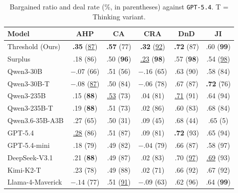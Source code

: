 \documentclass[11pt]{article}
\newcommand{\model}[1]{\texttt{#1}}
\newcommand{\lightrule}{\arrayrulecolor{black!20}\midrule\arrayrulecolor{black}}
\begin{document}
\begin{table}[ht]
\centering
\scriptsize
\setlength{\tabcolsep}{3pt}
\renewcommand{\arraystretch}{1.15}
\begin{tabular}{l c c c c c}
\toprule
\rowcolor{tableheader}
\textbf{Model} & \textbf{AHP} & \textbf{CA} & \textbf{CRA} & \textbf{DnD} & \textbf{JI} \\
\midrule
\rowcolor{tablerow}
Threshold (Ours) & \textbf{.35} (\underline{87}) & \textbf{.57} (77) & \textbf{.32} (\underline{92}) & \textbf{.72} (87) & .60 (\textbf{99}) \\
Surplus   & .18 (86)          & .50 (\textbf{96})  & \underline{.23} (\textbf{98})  & .57 (\textbf{98})  & .54 (\underline{98}) \\
\lightrule
\rowcolor{tablerow}
Qwen3-30B        & $-.07$ (66)          & .51 (56)           & $-.16$ (65)          & .63 (90)           & .58 (84)          \\
Qwen3-30B-T      & $-.08$ (\underline{87}) & .50 (84)        & $-.06$ (78)          & .67 (87)           & \textbf{.72} (76) \\
\rowcolor{tablerow}
Qwen3-235B       & .15 (\textbf{88})    & \underline{.53} (73) & .04 (81)          & \underline{.71} (91) & .64 (94)        \\
Qwen3-235B-T     & .19 (\textbf{88})    & .51 (73)           & .02 (86)             & .60 (83)           & .68 (84) \\
\rowcolor{tablerow}
Qwen3.6-35B-A3B  & .27 (65)    & .50 (31)           & .09 (45)             & .68 (44)           & .65 (5)           \\
GPT-5.4          & \underline{.28} (86)    & .51 (87)           & .09 (81)             & \textbf{.72} (93)  & .65 (94)          \\
GPT-5.4-mini     & .18 (79)             & .49 (82)           & $-.04$ (79)          & .66 (87)           & .58 (97)          \\
\rowcolor{tablerow}
DeepSeek-V3.1    & .21 (\textbf{88})    & .49 (87)           & .02 (83)          & .70 (\underline{97}) & \underline{.69} (93) \\
Kimi-K2-T        & .23 (78) & .49 (88)           & .02 (71)             & .66 (92)           & .67 (92)          \\
\rowcolor{tablerow}
Llama-4-Maverick & $-.14$ (77)         & .51 (\underline{91}) & $-.09$ (63)        & .62 (96)           & .64 (\textbf{99}) \\
\bottomrule
\end{tabular}
\caption{Bargained ratio and deal rate (\%, in parentheses) against \model{GPT-5.4}. T = Thinking variant.}
\label{tab:results-gpt}
\end{table}
\end{document}

